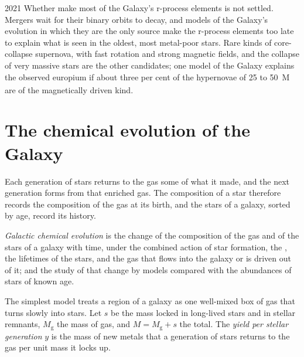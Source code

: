 \begin{dated}{2021}
Whether  make most of the Galaxy's r-process
elements is not settled. Mergers wait for their binary orbits to decay,
and models of the Galaxy's evolution in which they are the only source
make the r-process elements too late to explain what is seen in the
oldest, most metal-poor stars. Rare kinds of core-collapse supernova,
with fast rotation and strong magnetic fields, and the collapse of very
massive stars are the other candidates; one model of the Galaxy
explains the observed europium if about three per cent of the
hypernovae of 25 to \qty{50}{M_\odot} are of the magnetically driven
kind.
\end{dated}

\section{The chemical evolution of the Galaxy}\label{sec:b3:origin-of-elements:gce}

Each generation of stars returns to the gas some of what it made, and
the next generation forms from that enriched gas. The composition of a
star therefore records the composition of the gas at its birth, and the
stars of a galaxy, sorted by age, record its history.

\begin{definition}\label{def:b3:origin-of-elements:gce}
\emph{Galactic chemical evolution}
is the change of the composition of the gas and of the stars of a
galaxy with time, under the combined action of star formation, the
, the lifetimes of the stars, and the gas that flows into
the galaxy or is driven out of it; and the study of that change by
models compared with the abundances of stars of known age.
\end{definition}

The simplest model treats a region of a galaxy as one well-mixed box of
gas that turns slowly into stars. Let $s$ be the mass locked in
long-lived stars and in stellar remnants, $M_\mathrm{g}$ the mass of
gas, and $M = M_\mathrm{g} + s$ the total. The \emph{yield per stellar
generation} $y$ is the mass of new metals that a generation of stars
returns to the gas per unit mass it locks up.

